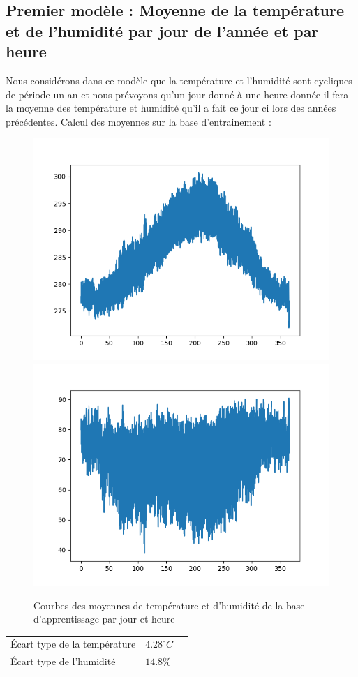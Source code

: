 \documentclass[11pt,a4paper]{article}
\begin{document}

\subsection{Premier modèle : Moyenne de la température et de l'humidité par jour de l'année et par heure }
Nous considérons dans ce modèle que la température et l'humidité sont cycliques de période un an et nous prévoyons qu'un jour donné à une heure donnée il fera la moyenne des température et humidité qu'il a fait ce jour ci lors des années précédentes.
Calcul des moyennes sur la base d'entrainement : \\

\begin{figure} [!h]
\centering
\includegraphics[width=0.48 \textwidth]{./imagesTIPE/moyenneT.png}\quad
\includegraphics[width=0.48 \textwidth]{./imagesTIPE/moyenneH.png}
\caption{\label{fig:190101Lolita} Courbes des moyennes de température et d'humidité de la base d'apprentissage par jour et heure}
\end{figure}

\begin{tabular}{lll}\hline
\hline
Écart type de la température& $4.28{}^{\circ}C$\\
Écart type de l'humidité       &  $ 14.8\% $\\
\hline 
\end{tabular}

\end{document}
